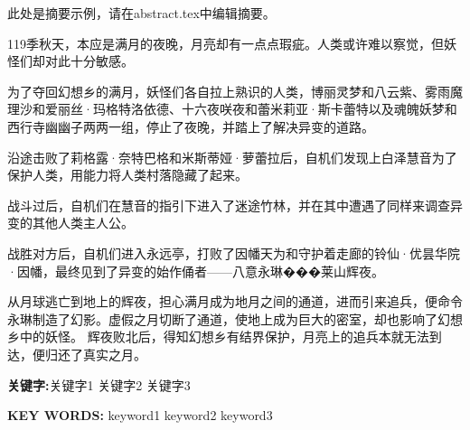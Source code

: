 \begin{cnabstract}

    此处是摘要示例，请在abstract.tex中编辑摘要。

    119季秋天，本应是满月的夜晚，月亮却有一点点瑕疵。人类或许难以察觉，但妖怪们却对此十分敏感。

    为了夺回幻想乡的满月，妖怪们各自拉上熟识的人类，博丽灵梦和八云紫、雾雨魔理沙和爱丽丝·玛格特洛依德、十六夜咲夜和蕾米莉亚·斯卡蕾特以及魂魄妖梦和西行寺幽幽子两两一组，停止了夜晚，并踏上了解决异变的道路。

    沿途击败了莉格露·奈特巴格和米斯蒂娅·萝蕾拉后，自机们发现上白泽慧音为了保护人类，用能力将人类村落隐藏了起来。

    战斗过后，自机们在慧音的指引下进入了迷途竹林，并在其中遭遇了同样来调查异变的其他人类主人公。

    战胜对方后，自机们进入永远亭，打败了因幡天为和守护着走廊的铃仙·优昙华院·因幡，最终见到了异变的始作俑者——八意永琳���莱山辉夜。

    从月球逃亡到地上的辉夜，担心满月成为地月之间的通道，进而引来追兵，便命令永琳制造了幻影。虚假之月切断了通道，使地上成为巨大的密室，却也影响了幻想乡中的妖怪。
    辉夜败北后，得知幻想乡有结界保护，月亮上的追兵本就无法到达，便归还了真实之月。
    \par\textbf{关键字:}关键字1 \hspace{2em} 关键字2 \hspace{2em} 关键字3
\end{cnabstract}
\setmainfont{Times New Roman}
\begin{enabstract}

    \lipsum[1]
    \par\textbf{KEY WORDS:} keyword1 \hspace{2em} keyword2 \hspace{2em} keyword3
\end{enabstract}
\setmainfont[AutoFakeBold=2.17]{simsun.ttc}  %

